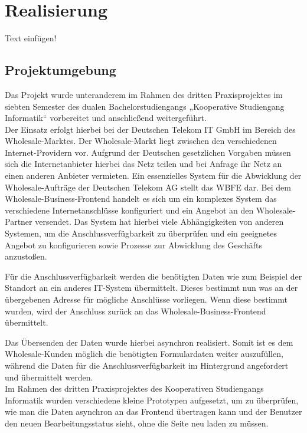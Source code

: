 \chapter{Realisierung}
\label{ch:Realisierung}
Text einfügen!

\section{Projektumgebung}
Das Projekt wurde unteranderem im Rahmen des dritten Praxisprojektes im siebten Semester des dualen Bachelorstudiengangs „Kooperative Studiengang Informatik“ vorbereitet und anschließend weitergeführt. \\

Der Einsatz erfolgt hierbei bei der Deutschen Telekom IT GmbH im Bereich des Wholesale-Marktes. Der Wholesale-Markt liegt zwischen den verschiedenen Internet-Providern vor. Aufgrund der Deutschen gesetzlichen Vorgaben müssen sich die Internetanbieter hierbei das Netz teilen und bei Anfrage ihr Netz an einen anderen Anbieter vermieten.  Ein essenzielles System für die Abwicklung der Wholesale-Aufträge der Deutschen Telekom AG stellt das \ac{WBFE} dar. Bei dem Wholesale-Business-Frontend handelt es sich um ein komplexes System das verschiedene Internetanschlüsse konfiguriert und ein Angebot an den Wholesale-Partner versendet. Das System hat hierbei viele Abhängigkeiten von anderen Systemen, um die Anschlussverfügbarkeit zu überprüfen und ein geeignetes Angebot zu konfigurieren sowie Prozesse zur Abwicklung des Geschäfts anzustoßen.

Für die Anschlussverfügbarkeit werden die benötigten Daten wie zum Beispiel der Standort an ein anderes IT-System übermittelt. Dieses bestimmt nun was an der übergebenen Adresse für mögliche Anschlüsse vorliegen. Wenn diese bestimmt wurden, wird der Anschluss zurück an das Wholesale-Business-Frontend übermittelt.

Das Übersenden der Daten wurde hierbei asynchron realisiert. Somit ist es dem Wholesale-Kunden möglich die benötigten Formulardaten weiter auszufüllen, während die Daten für die Anschlussverfügbarkeit im Hintergrund angefordert und übermittelt werden. \\

Im Rahmen des dritten Praxisprojektes des Kooperativen Studiengangs Informatik wurden verschiedene kleine Prototypen aufgesetzt, um zu überprüfen, wie man die Daten asynchron an das Frontend übertragen kann und der Benutzer den neuen Bearbeitungsstatus sieht, ohne die Seite neu laden zu müssen.

